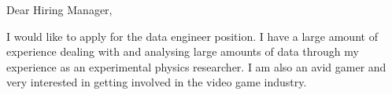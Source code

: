 \documentclass{resume} %
\begin{document}

\begin{rSection}{}
Dear Hiring Manager,


I would like to apply for the data engineer position. I have a large amount of experience dealing with and analysing large amounts of data through my experience as an experimental physics researcher. I am also an avid gamer and very interested in getting involved in the video game industry.



\end{rSection}


\end{document}
